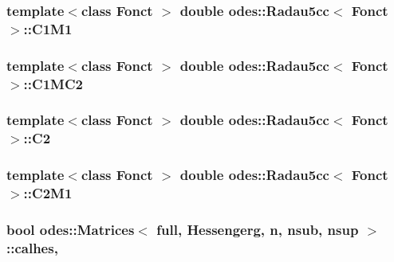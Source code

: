 \hypertarget{classodes_1_1Radau5cc_a1cf578a3f19e8e43321e182c46f710f4}{
\subsubsection[{C1\-M1}]{\setlength{\rightskip}{0pt plus 5cm}template$<$class Fonct $>$ double {\bf odes\-::\-Radau5cc}$<$ Fonct $>$\-::C1\-M1\hspace{0.3cm}{\ttfamily [private]}}}\label{classodes_1_1Radau5cc_a1cf578a3f19e8e43321e182c46f710f4}
\hypertarget{classodes_1_1Radau5cc_a9d7ed1a3ffb2f3c582e1790e65f24671}{
\subsubsection[{C1\-M\-C2}]{\setlength{\rightskip}{0pt plus 5cm}template$<$class Fonct $>$ double {\bf odes\-::\-Radau5cc}$<$ Fonct $>$\-::C1\-M\-C2\hspace{0.3cm}{\ttfamily [private]}}}\label{classodes_1_1Radau5cc_a9d7ed1a3ffb2f3c582e1790e65f24671}
\hypertarget{classodes_1_1Radau5cc_a4c4e52ad2bb85b6e3a598b75aecbdad8}{
\subsubsection[{C2}]{\setlength{\rightskip}{0pt plus 5cm}template$<$class Fonct $>$ double {\bf odes\-::\-Radau5cc}$<$ Fonct $>$\-::C2\hspace{0.3cm}{\ttfamily [private]}}}\label{classodes_1_1Radau5cc_a4c4e52ad2bb85b6e3a598b75aecbdad8}
\hypertarget{classodes_1_1Radau5cc_ab2b14b1062b5fb6dde7557fbac202c29}{
\subsubsection[{C2\-M1}]{\setlength{\rightskip}{0pt plus 5cm}template$<$class Fonct $>$ double {\bf odes\-::\-Radau5cc}$<$ Fonct $>$\-::C2\-M1\hspace{0.3cm}{\ttfamily [private]}}}\label{classodes_1_1Radau5cc_ab2b14b1062b5fb6dde7557fbac202c29}
\hypertarget{classodes_1_1Matrices_a82e935680c27f58bcff8a559700411c6}{
\subsubsection[{calhes}]{\setlength{\rightskip}{0pt plus 5cm}bool {\bf odes\-::\-Matrices}$<$ full, Hessengerg, {\bf n}, nsub, {\bf nsup} $>$\-::calhes\hspace{0.3cm}{\ttfamily [protected]}, {\ttfamily [inherited]}}}\label{classodes_1_1Matrices_a82e935680c27f58bcff8a559700411c6}
